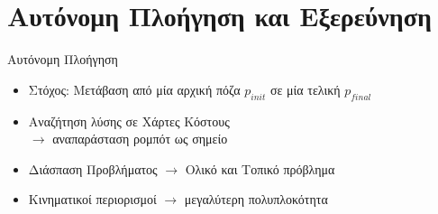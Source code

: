 \documentclass[10pt, compress, handout]{beamer} %
\begin{document}
\section{Αυτόνομη Πλοήγηση και Εξερεύνηση}

\begin{frame}{Αυτόνομη Πλοήγηση}
	\begin{itemize}
		\item Στόχος: Μετάβαση από μία αρχική πόζα $p_{init}$ σε μία τελική $p_{final}$
		\item	Αναζήτηση λύσης σε Χάρτες Κόστους\\ $\rightarrow$ αναπαράσταση ρομπότ ως  σημείο
		\item Διάσπαση Προβλήματος $\rightarrow$ Ολικό και Τοπικό πρόβλημα
		\item Κινηματικοί περιορισμοί $\rightarrow$ μεγαλύτερη πολυπλοκότητα
	\end{itemize}
	\vspace{-0.5cm}
	\begin{figure}
		\centering
		\\[0.5cm]
	\end{figure}
\end{frame}
\end{document}
